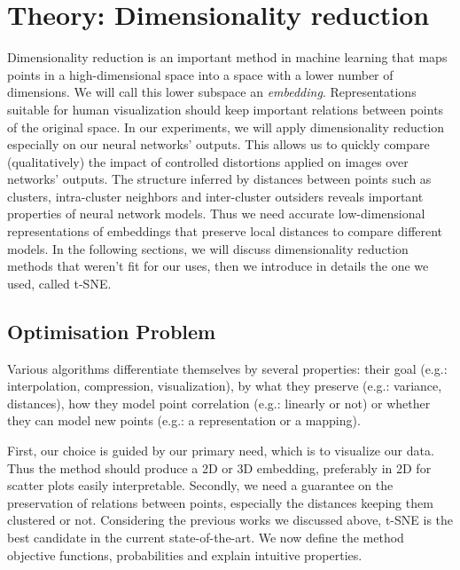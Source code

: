 \documentclass[a4paper,12pt]{report}
\newcommand{\eg}{e.g.}
\begin{document}
\chapter{Theory: Dimensionality reduction}
Dimensionality reduction is an important method in machine learning that maps points in a high-dimensional space into a space with a lower number of dimensions.
We will call this lower subspace an {\em embedding}.
Representations suitable for human visualization should keep important relations between points of the original space.
In our experiments, we will apply dimensionality reduction especially on our neural networks' outputs.
This allows us to quickly compare (qualitatively) the impact of controlled distortions applied on images over networks' outputs.
The structure inferred by distances between points such as clusters, intra-cluster neighbors and inter-cluster outsiders reveals important properties of neural network models.
Thus we need accurate low-dimensional representations of embeddings that preserve local distances to compare different models.
In the following sections, we will discuss dimensionality reduction methods that weren't fit for our uses, then we introduce in details the one we used, called t-SNE.

\section{Optimisation Problem}
Various algorithms differentiate themselves by several properties: their goal (\eg: interpolation, compression, visualization), by what they preserve (\eg: variance, distances), how they model point correlation (\eg: linearly or not) or whether they can model new points (\eg: a representation or a mapping).

First, our choice is guided by our primary need, which is to visualize our data.
Thus the method should produce a 2D or 3D embedding, preferably in 2D for scatter plots easily interpretable.
Secondly, we need a guarantee on the preservation of relations between points, especially the distances keeping them clustered or not.
Considering the previous works we discussed above, t-SNE is the best candidate in the current state-of-the-art.
We now define the method objective functions, probabilities and explain intuitive properties.
\end{document}
